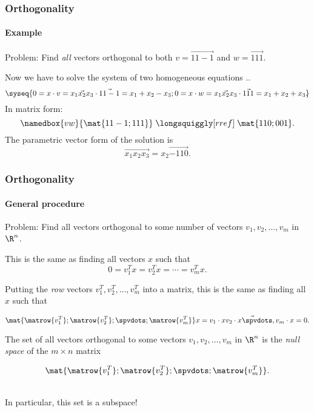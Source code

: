
\begin{frame}
\frametitle{Orthogonality}
\framesubtitle{Example}

\alert{Problem:} Find \emph{all} vectors orthogonal to both $v = \vec{1 1 -1}$ and 
$w = \vec{1 1 1}$.

\medskip
\begin{webonly}
Now we have to solve the system of two homogeneous equations
\spalignsysdelims..
\[ \syseq{
  0 = x\cdot v = \vec{x_1 x_2 x_3}\cdot\vec{1 1 -1} = x_1 + x_2 - x_3;
  0 = x\cdot w = \vec{x_1 x_2 x_3}\cdot\vec{1 1 1}  = x_1 + x_2 + x_3\rlap.} \]
In matrix form:
\[ \namedbox{vw}{\mat{1 1 -1; 1 1 1}} \;\longsquiggly[rref]\;\mat{1 1 0; 0 0 1}. \]
The parametric vector form of the solution is 
\[ \vec{x_1 x_2 x_3} = x_2\vec{-1 1 0}. \]
\end{webonly}

\end{frame}



\begin{frame}
\frametitle{Orthogonality}
\framesubtitle{General procedure}

\alert{Problem:} Find all vectors orthogonal to some number of vectors
$v_1,v_2,\ldots,v_m$ in $\R^n$.

\pause\medskip
This is the same as finding all vectors $x$ such that 
\[ 0 = v_1^Tx = v_2^Tx = \cdots = v_m^Tx. \]
\pause\leavevmode
\begin{minipage}[c]{0.5\linewidth}
  Putting the \emph{row} vectors $v_1^T,v_2^T,\ldots,v_m^T$ into a matrix, this
  is the same as finding all $x$ such that
\end{minipage}%
\begin{minipage}[c]{0.5\linewidth}
  \[
  \mat{ \matrow{v_1^T};
    \matrow{v_2^T}; \spvdots;
    \matrow{v_m^T}} x = 
  \vec{v_1\cdot x v_2\cdot x \spvdots, v_m\cdot x} = 0. \]
\end{minipage}%
\pause\medskip
\begin{bluebox}[Important]{.8\linewidth}
  \vskip-2mm
  \begin{minipage}[c]{0.7\linewidth}
    The set of all vectors orthogonal to some vectors $v_1,v_2,\ldots,v_m$ in
    $\R^n$ is the \emph{null space} of the $m\times n$ matrix
  \end{minipage}
  \begin{minipage}[c]{0.25\linewidth}
  \[ \mat{
    \matrow{v_1^T};
    \matrow{v_2^T};
    \spvdots;
    \matrow{v_m^T}}. \]
  \end{minipage}\\
  \pause
  In particular, this set is a subspace!
\end{bluebox}

\end{frame}


